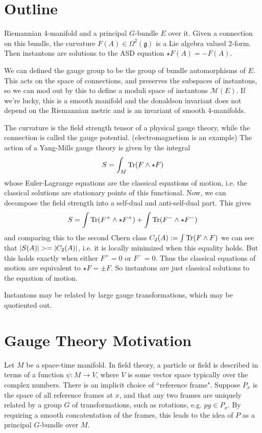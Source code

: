 \section{Outline}
Riemannian 4-manifold and a principal $G$-bundle $E$ over it. Given a connection
on this bundle, the curvature  $F(A)\in \Omega^2(\mathfrak{g})$ is a Lie algebra
valued 2-form. Then instantons are solutions to the ASD equation $\star F(A) =
-F(A)$. 

We can defined the gauge group to be the group of bundle automorphisms of  $E$.
This acts on the space of connections, and preserves the subspaces of
instantons, so we can mod out by this to define a moduli space of instantons
$\mathcal{M}(E)$. If we're lucky, this is a smooth manifold and the donaldson
invariant does not depend on the Riemannian metric and is an invariant of smooth
4-manifolds. 

The curvature is the field strength tensor of a physical gauge theory, while the
connection is called the gauge potential. (electromagnetism is an example)
The action of a Yang-Mills gauge theory is given by the integral
\[
S = \int_M \operatorname{Tr} (F\wedge \star F)
\] 
whose Euler-Lagrange equations are the classical equations of motion, i.e. the
classical solutions are stationary points of this functional. Now, we can
decompose the field strength into a self-dual and anti-self-dual part.
This gives 
\[
S = \int \operatorname{Tr}(F^{+}\wedge \star F^{+}) +\int \operatorname{Tr}(F^{-}\wedge \star F^{-})
\] 
and comparing this to the second Chern class $C_2(A) := \int \operatorname{Tr}(F\wedge F)$ we
can see that $\abs{S(A)} >= \abs{C_2(A)}$, i.e. it is locally minimized when
this equality holds. But this holds exactly when either $F^{+}=0$ or $F^{-}=0$.
Thus the classical equations of motion are equivalent to $\star F = \pm F$. So
instantons are just classical solutions to the equation of motion.

Instantons may be related by large gauge transformations, which may be
quotiented out.


\section{Gauge Theory Motivation}
Let $M$ be a space-time manifold. In field theory, a particle or field is 
described in terms of a function $\psi:M\to V$, where  $V$ is some vector
space typically over the complex numbers. There is an implicit choice of
``reference frame". Suppose  $P_x$ is the space of all reference frames at $x$, and
that any two frames are uniquely related by a group  $G$ of transformations,
such as rotations, e.g. $pg\in P_x$. 
By requiring a smooth concatentation of the frames, this leads to the idea of $P$ as a
 principal $G$-bundle over  $M$.

